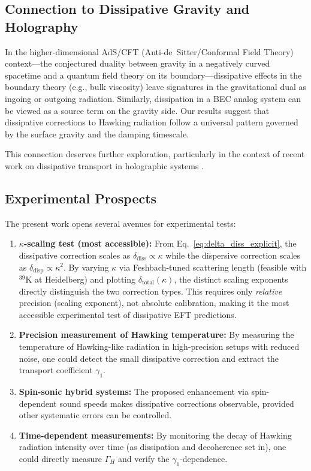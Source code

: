 \documentclass[aps,prl,twocolumn,superscriptaddress,nofootinbib,amsmath,amssymb]{revtex4-2}
\begin{document}
\subsection{Connection to Dissipative Gravity and Holography}

In the higher-dimensional AdS/CFT (Anti-de~Sitter/Conformal Field Theory) context---the conjectured duality between gravity in a negatively curved spacetime and a quantum field theory on its boundary---dissipative effects in the boundary theory (e.g., bulk viscosity) leave signatures in the gravitational dual as ingoing or outgoing radiation. Similarly, dissipation in a BEC analog system can be viewed as a source term on the gravity side. Our results suggest that dissipative corrections to Hawking radiation follow a universal pattern governed by the surface gravity and the damping timescale.

This connection deserves further exploration, particularly in the context of recent work on dissipative transport in holographic systems \cite{Jana2020}.

\subsection{Experimental Prospects}

The present work opens several avenues for experimental tests:
\begin{enumerate}
\item \textbf{$\kappa$-scaling test (most accessible):} From Eq.~\eqref{eq:delta_diss_explicit}, the dissipative correction scales as $\delta_{\text{diss}} \propto \kappa$ while the dispersive correction scales as $\delta_{\text{disp}} \propto \kappa^2$. By varying $\kappa$ via Feshbach-tuned scattering length (feasible with $^{39}$K at Heidelberg) and plotting $\delta_{\text{total}}(\kappa)$, the distinct scaling exponents directly distinguish the two correction types. This requires only \textit{relative} precision (scaling exponent), not absolute calibration, making it the most accessible experimental test of dissipative EFT predictions.
\item \textbf{Precision measurement of Hawking temperature:} By measuring the temperature of Hawking-like radiation in high-precision setups with reduced noise, one could detect the small dissipative correction and extract the transport coefficient $\gamma_1$.
\item \textbf{Spin-sonic hybrid systems:} The proposed enhancement via spin-dependent sound speeds makes dissipative corrections observable, provided other systematic errors can be controlled.
\item \textbf{Time-dependent measurements:} By monitoring the decay of Hawking radiation intensity over time (as dissipation and decoherence set in), one could directly measure $\Gamma_H$ and verify the $\gamma_1$-dependence.
\end{enumerate}
\end{document}
